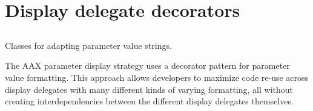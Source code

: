 \hypertarget{a00817}{}\section{Display delegate decorators}
\label{a00817}


\subsection{ }
Classes for adapting parameter value strings. 

The A\+AX parameter display strategy uses a decorator pattern for parameter value formatting. This approach allows developers to maximize code re-\/use across display delegates with many different kinds of varying formatting, all without creating interdependencies between the different display delegates themselves.

